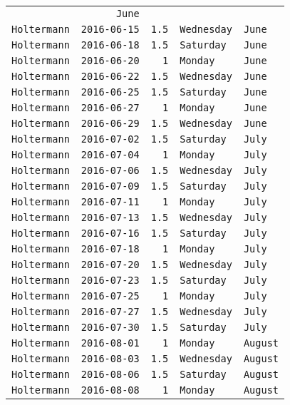 \documentclass[11pt,A4paper,]{article}
\begin{document}
\begin{longtable}[]{@{}lrrll@{}}
& \texttt{June}\tabularnewline
\texttt{Holtermann} & \texttt{2016-06-15} & \texttt{1.5} &
\texttt{Wednesday} & \texttt{June}\tabularnewline
\texttt{Holtermann} & \texttt{2016-06-18} & \texttt{1.5} &
\texttt{Saturday} & \texttt{June}\tabularnewline
\texttt{Holtermann} & \texttt{2016-06-20} & \texttt{1} & \texttt{Monday}
& \texttt{June}\tabularnewline
\texttt{Holtermann} & \texttt{2016-06-22} & \texttt{1.5} &
\texttt{Wednesday} & \texttt{June}\tabularnewline
\texttt{Holtermann} & \texttt{2016-06-25} & \texttt{1.5} &
\texttt{Saturday} & \texttt{June}\tabularnewline
\texttt{Holtermann} & \texttt{2016-06-27} & \texttt{1} & \texttt{Monday}
& \texttt{June}\tabularnewline
\texttt{Holtermann} & \texttt{2016-06-29} & \texttt{1.5} &
\texttt{Wednesday} & \texttt{June}\tabularnewline
\texttt{Holtermann} & \texttt{2016-07-02} & \texttt{1.5} &
\texttt{Saturday} & \texttt{July}\tabularnewline
\texttt{Holtermann} & \texttt{2016-07-04} & \texttt{1} & \texttt{Monday}
& \texttt{July}\tabularnewline
\texttt{Holtermann} & \texttt{2016-07-06} & \texttt{1.5} &
\texttt{Wednesday} & \texttt{July}\tabularnewline
\texttt{Holtermann} & \texttt{2016-07-09} & \texttt{1.5} &
\texttt{Saturday} & \texttt{July}\tabularnewline
\texttt{Holtermann} & \texttt{2016-07-11} & \texttt{1} & \texttt{Monday}
& \texttt{July}\tabularnewline
\texttt{Holtermann} & \texttt{2016-07-13} & \texttt{1.5} &
\texttt{Wednesday} & \texttt{July}\tabularnewline
\texttt{Holtermann} & \texttt{2016-07-16} & \texttt{1.5} &
\texttt{Saturday} & \texttt{July}\tabularnewline
\texttt{Holtermann} & \texttt{2016-07-18} & \texttt{1} & \texttt{Monday}
& \texttt{July}\tabularnewline
\texttt{Holtermann} & \texttt{2016-07-20} & \texttt{1.5} &
\texttt{Wednesday} & \texttt{July}\tabularnewline
\texttt{Holtermann} & \texttt{2016-07-23} & \texttt{1.5} &
\texttt{Saturday} & \texttt{July}\tabularnewline
\texttt{Holtermann} & \texttt{2016-07-25} & \texttt{1} & \texttt{Monday}
& \texttt{July}\tabularnewline
\texttt{Holtermann} & \texttt{2016-07-27} & \texttt{1.5} &
\texttt{Wednesday} & \texttt{July}\tabularnewline
\texttt{Holtermann} & \texttt{2016-07-30} & \texttt{1.5} &
\texttt{Saturday} & \texttt{July}\tabularnewline
\texttt{Holtermann} & \texttt{2016-08-01} & \texttt{1} & \texttt{Monday}
& \texttt{August}\tabularnewline
\texttt{Holtermann} & \texttt{2016-08-03} & \texttt{1.5} &
\texttt{Wednesday} & \texttt{August}\tabularnewline
\texttt{Holtermann} & \texttt{2016-08-06} & \texttt{1.5} &
\texttt{Saturday} & \texttt{August}\tabularnewline
\texttt{Holtermann} & \texttt{2016-08-08} & \texttt{1} & \texttt{Monday}
& \texttt{August}\tabularnewline

\end{longtable}
\end{document}
